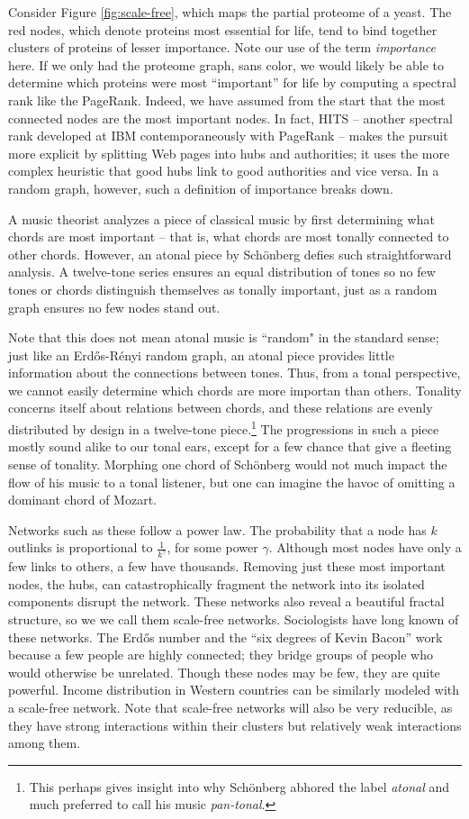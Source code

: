 \documentclass[11pt,letterpaper]{amsart}
\begin{document}
Consider Figure \ref{fig:scale-free}, which maps the partial proteome of a
yeast. The red nodes, which denote proteins most essential for life, tend to
bind together clusters of proteins of lesser importance. Note our use of the
term \textit{importance} here. If we only had the proteome graph, sans color, we
would likely be able to determine which proteins were most ``important'' for
life by computing a spectral rank like the PageRank. Indeed, we have assumed
from the start that the most connected nodes are the most important nodes. In
fact, HITS -- another spectral rank developed at IBM contemporaneously with
PageRank -- makes the pursuit more explicit by splitting Web pages into hubs and
authorities; it uses the more complex heuristic that good hubs link to good
authorities and vice versa. In a random graph, however, such a definition of
importance breaks down.

A music theorist analyzes a piece of classical music by first determining what
chords are most important -- that is, what chords are most tonally connected to
other chords. However, an atonal piece by Schönberg defies such straightforward
analysis. A twelve-tone series ensures an equal distribution of tones so no few
tones or chords distinguish themselves as tonally important, just as a random
graph ensures no few nodes stand out.

Note that this does not mean atonal music is ``random" in the standard sense;
just like an Erdős-Rényi random graph, an atonal piece provides little
information about the connections between tones. Thus, from a tonal perspective,
we cannot easily determine which chords are more importan than others. Tonality
concerns itself about relations between chords, and these relations are evenly
distributed by design in a twelve-tone piece.\footnote{This perhaps gives
  insight into why Schönberg abhored the label \textit{atonal} and much
  preferred to call his music \textit{pan-tonal}.} The progressions in such a
piece mostly sound alike to our tonal ears, except for a few chance that give a
fleeting sense of tonality. Morphing one chord of Schönberg would not much
impact the flow of his music to a tonal listener, but one can imagine the havoc
of omitting a dominant chord of Mozart.

Networks such as these follow a power law. The probability that a node has $k$
outlinks is proportional to $\frac{1}{k^\gamma}$, for some power $\gamma$.
Although most nodes have only a few links to others, a few have thousands.
Removing just these most important nodes, the hubs, can catastrophically
fragment the network into its isolated components disrupt the network. These
networks also reveal a beautiful fractal structure, so we we call them
scale-free networks. Sociologists have long known of these networks. The Erdős
number and the ``six degrees of Kevin Bacon'' work because a few people are
highly connected; they bridge groups of people who would otherwise be unrelated.
Though these nodes may be few, they are quite powerful. Income distribution in
Western countries can be similarly modeled with a scale-free network. Note that
scale-free networks will also be very reducible, as they have strong
interactions within their clusters but relatively weak interactions among them.
\end{document}
